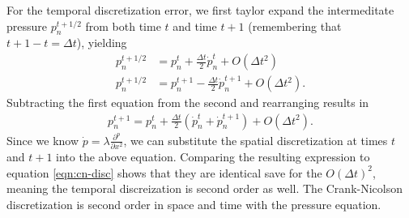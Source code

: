 \documentclass{article}
\begin{document}
For the temporal discretization error, we first taylor expand the intermeditate pressure $p^{t+1/2}_n$ from both time $t$ and time $t+1$ (remembering that $t+ 1 - t = \Delta t$), yielding
\begin{align}
    p^{t+1/2}_{n} &= p^{t}_{n} + \frac{\Delta t}{2} \dot{p}^{t}_{n} + O(\Delta t^2) \\
    p^{t+1/2}_{n} &= p^{t+1}_{n} - \frac{\Delta t}{2} \dot{p}^{t+1}_{n} + O(\Delta t^2).
\end{align}
Subtracting the first equation from the second and rearranging results in
\begin{align}
    p^{t+1}_{n} = p^{t}_{n} + \frac{\Delta t}{2} (\dot{p}^{t}_{n} + \dot{p}^{t+1}_{n}) + O(\Delta t^2).
\end{align}
Since we know $\dot{p} = \lambda \frac{\partial^ p}{\partial x^2}$, we can substitute the spatial discretization at times $t$ and $t+1$ into the above equation.
Comparing the resulting expression to equation \eqref{eqn:cn-disc} shows that they are identical save for the $O(\Delta t)^2$, meaning the temporal discreization is second order as well. The Crank-Nicolson discretization is second order in space and time with the pressure equation.
\end{document}
